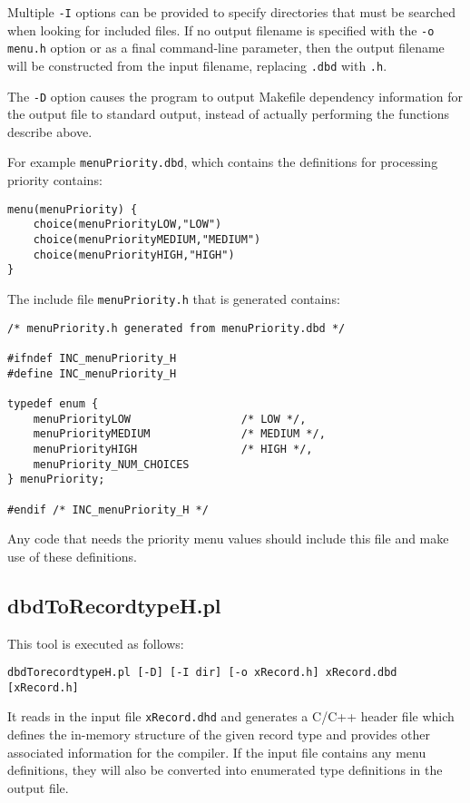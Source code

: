 Multiple \verb|-I| options can be provided to specify directories that must be searched when looking for included files.
If no output filename is specified with the \verb|-o menu.h| option or as a final command-line parameter, then the output filename will be constructed from the input filename, replacing \verb|.dbd| with \verb|.h|.

The \verb|-D| option causes the program to output Makefile dependency information for the output file to standard output, instead of actually performing the functions describe above.

For example \verb|menuPriority.dbd|, which contains the definitions for processing priority contains:

\begin{verbatim}
menu(menuPriority) {
    choice(menuPriorityLOW,"LOW")
    choice(menuPriorityMEDIUM,"MEDIUM")
    choice(menuPriorityHIGH,"HIGH")
}
\end{verbatim}

The include file \verb|menuPriority.h| that is generated contains:

\begin{verbatim}
/* menuPriority.h generated from menuPriority.dbd */

#ifndef INC_menuPriority_H
#define INC_menuPriority_H

typedef enum {
    menuPriorityLOW                 /* LOW */,
    menuPriorityMEDIUM              /* MEDIUM */,
    menuPriorityHIGH                /* HIGH */,
    menuPriority_NUM_CHOICES
} menuPriority;

#endif /* INC_menuPriority_H */
\end{verbatim}

Any code that needs the priority menu values should include this file and make use of these definitions.

\subsection{dbdToRecordtypeH.pl}

This tool is executed as follows:

\begin{verbatim}
dbdTorecordtypeH.pl [-D] [-I dir] [-o xRecord.h] xRecord.dbd [xRecord.h]
\end{verbatim}

It reads in the input file \verb|xRecord.dhd| and generates a C/C++ header file which defines the in-memory structure of the given record type and provides other associated information for the compiler.
If the input file contains any menu definitions, they will also be converted into enumerated type definitions in the output file.

